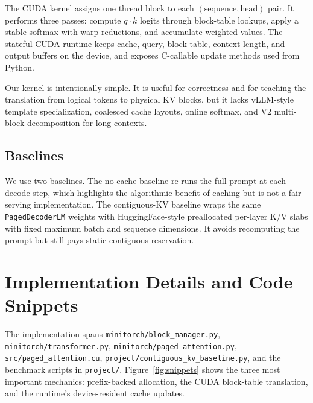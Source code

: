 \documentclass{article}
\begin{document}
The CUDA kernel assigns one thread block to each \((\text{sequence}, \text{head})\) pair.  It performs three passes: compute \(q \cdot k\) logits through block-table lookups, apply a stable softmax with warp reductions, and accumulate weighted values.  The stateful CUDA runtime keeps cache, query, block-table, context-length, and output buffers on the device, and exposes C-callable update methods used from Python.

Our kernel is intentionally simple.  It is useful for correctness and for teaching the translation from logical tokens to physical KV blocks, but it lacks vLLM-style template specialization, coalesced cache layouts, online softmax, and V2 multi-block decomposition for long contexts.

\subsection{Baselines}

We use two baselines.  The no-cache baseline re-runs the full prompt at each decode step, which highlights the algorithmic benefit of caching but is not a fair serving implementation.  The contiguous-KV baseline wraps the same \texttt{PagedDecoderLM} weights with HuggingFace-style preallocated per-layer K/V slabs with fixed maximum batch and sequence dimensions.  It avoids recomputing the prompt but still pays static contiguous reservation.

\section{Implementation Details and Code Snippets}

The implementation spans \texttt{minitorch/block\_manager.py}, \texttt{minitorch/transformer.py}, \texttt{minitorch/paged\_attention.py}, \texttt{src/paged\_attention.cu}, \texttt{project/contiguous\_kv\_baseline.py}, and the benchmark scripts in \texttt{project/}.  Figure~\ref{fig:snippets} shows the three most important mechanics: prefix-backed allocation, the CUDA block-table translation, and the runtime's device-resident cache updates.
\end{document}
